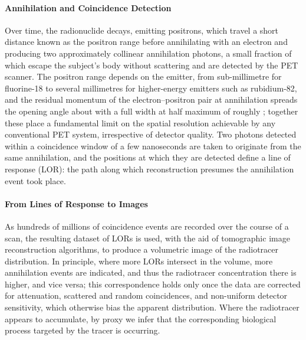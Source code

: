 \paragraph{Annihilation and Coincidence Detection}
Over time, the radionuclide decays, emitting positrons, which travel a short distance known as the positron range before annihilating with an electron and producing two approximately collinear  annihilation photons, a small fraction of which escape the subject's body without scattering and are detected by the PET scanner.
The positron range depends on the emitter, from sub-millimetre for fluorine-18 to several millimetres for higher-energy emitters such as rubidium-82, and the residual momentum of the electron--positron pair at annihilation spreads the opening angle about  with a full width at half maximum of roughly ; together these place a fundamental limit on the spatial resolution achievable by any conventional PET system, irrespective of detector quality.
Two photons detected within a coincidence window of a few nanoseconds are taken to originate from the same annihilation, and the positions at which they are detected define a line of response (LOR): the path along which reconstruction presumes the annihilation event took place.

\paragraph{From Lines of Response to Images}
As hundreds of millions of coincidence events are recorded over the course of a scan, the resulting dataset of LORs is used, with the aid of tomographic image reconstruction algorithms, to produce a volumetric image of the radiotracer distribution.
In principle, where more LORs intersect in the volume, more annihilation events are indicated, and thus the radiotracer concentration there is higher, and vice versa; this correspondence holds only once the data are corrected for attenuation, scattered and random coincidences, and non-uniform detector sensitivity, which otherwise bias the apparent distribution.
Where the radiotracer appears to accumulate, by proxy we infer that the corresponding biological process targeted by the tracer is occurring.

